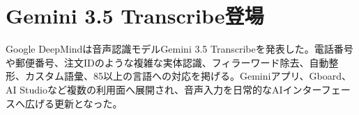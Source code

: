 \section{Gemini 3.5 Transcribe登場}
Google DeepMindは音声認識モデルGemini 3.5 Transcribeを発表した。電話番号や郵便番号、注文IDのような複雑な実体認識、フィラーワード除去、自動整形、カスタム語彙、85以上の言語への対応を掲げる。Geminiアプリ、Gboard、AI Studioなど複数の利用面へ展開され、音声入力を日常的なAIインターフェースへ広げる更新となった。
